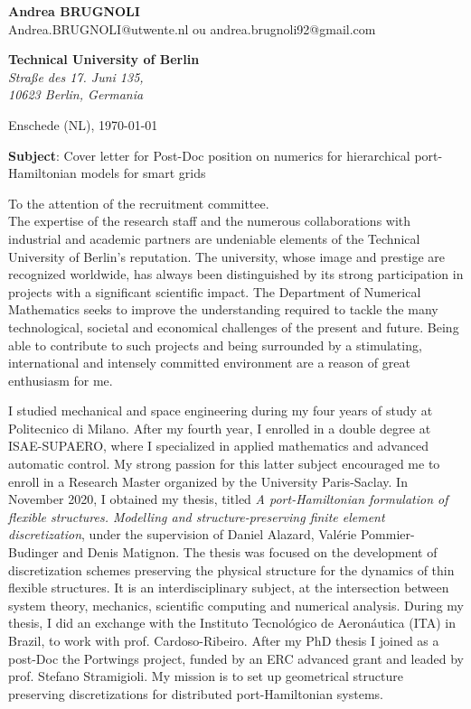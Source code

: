 \documentclass[11pt]{letter}
\begin{document}
	\sffamily
	\begin{flushleft}
		{\bfseries Andrea \textsc{BRUGNOLI}}\\[.35ex]
		Andrea.BRUGNOLI@utwente.nl ou andrea.brugnoli92@gmail.com
	\end{flushleft}
	\begin{flushright}
		{\bfseries Technical University of Berlin}\\[.35ex]
		\small\itshape
		Straße des 17. Juni 135,\\
		 10623 Berlin, Germania
	\end{flushright}
	\begin{flushright}
		Enschede (NL), \today 
	\end{flushright}
	\textbf{Subject}: Cover letter for Post-Doc position on numerics for hierarchical port-Hamiltonian models for smart grids
	
	
	To the attention of the recruitment committee.\\
	
	The expertise of the research staff and the numerous collaborations with industrial and academic partners are undeniable elements of the Technical University of Berlin's reputation. The university, whose image and prestige are recognized worldwide, has always been distinguished by its strong participation in projects with a significant scientific impact. The Department of Numerical Mathematics seeks to improve the understanding required to tackle the many technological, societal and economical challenges of the present and future. Being able to contribute to such projects and being surrounded by a stimulating, international and intensely committed environment are a reason of great enthusiasm for me.
	
	I studied mechanical and space engineering during my four years of study at Politecnico di Milano. After my fourth year, I enrolled in a double degree at ISAE-SUPAERO, where I specialized in applied mathematics and advanced automatic control. My strong passion for this latter subject encouraged me to enroll in a Research Master organized by the University Paris-Saclay. In November 2020, I obtained my thesis, titled \textit{A port-Hamiltonian formulation of flexible structures. Modelling and structure-preserving finite element discretization}, under the supervision of Daniel Alazard, Valérie Pommier-Budinger and Denis Matignon. The thesis was focused on the development of discretization schemes preserving the physical structure for the dynamics of thin flexible structures. It is an interdisciplinary subject, at the intersection between system theory, mechanics, scientific computing and numerical analysis. During my thesis, I did an exchange with the Instituto Tecnológico de Aeronáutica (ITA) in Brazil, to work with prof. Cardoso-Ribeiro. After my PhD thesis I joined as a post-Doc the Portwings project, funded by an ERC advanced grant and leaded by prof. Stefano Stramigioli. My mission is to set up geometrical structure preserving discretizations for distributed port-Hamiltonian systems.
	
\end{document}
